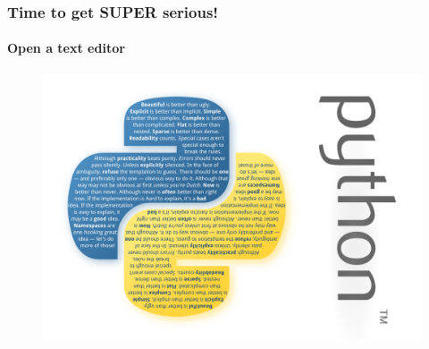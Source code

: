 \documentclass[handout]{beamer}
\begin{document}
\begin{frame}
\frametitle{Time to get SUPER serious!}
\framesubtitle{Open a text editor}
\vspace{-1cm}
\begin{figure}
 \includegraphics[scale=0.45, clip = true, trim = 0mm  0mm 10cm 0mm]{zen-of-python-poster.pdf}\end{figure}
\end{frame}
\end{document}
